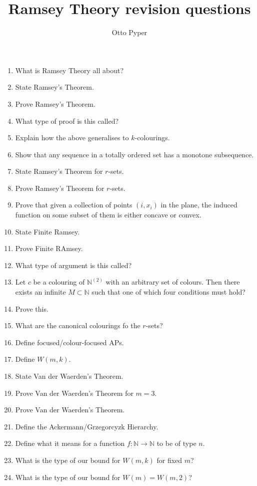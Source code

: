\documentclass[10pt]{article}
\title{Ramsey Theory revision questions}
\author{Otto Pyper}
\date{}
\newcommand{\bb}[1]{\mathbb{#1}}
\newcommand{\N}{\bb{N}}
\newcommand{\ra}{\to}
\begin{document}
\maketitle

\begin{enumerate}
    \item What is Ramsey Theory all about?
    \item State Ramsey's Theorem.
    \item Prove Ramsey's Theorem.
    \item What type of proof is this called?
    \item Explain how the above generalises to $k$-colourings.
    \item Show that any sequence in a totally ordered set has a monotone subsequence.
    \item State Ramsey's Theorem for $r$-sets.
    \item Prove Ramsey's Theorem for $r$-sets.
    \item Prove that given a collection of points $(i,x_i)$ in the plane, the induced function on some subset of them is either concave or convex.
    \item State Finite Ramsey.
    \item Prove Finite RAmsey.
    \item What type of argument is this called?
    \item Let $c$ be a colouring of $\N^{(2)}$ with an arbitrary set of colours. Then there exists an infinite $M\subset \N$ such that one of which four conditions must hold?
    \item Prove this.
    \item What are the canonical colourings fo the $r$-sets?
    \item Define focused/colour-focused APs.
    \item Define $W(m,k)$.
    \item State Van der Waerden's Theorem.
    \item Prove Van der Waerden's Theorem for $m = 3$.
    \item Prove Van der Waerden's Theorem.
    \item Define the Ackermann/Grzegorcyzk Hierarchy.
    \item Define what it means for a function $f : \N \ra \N$ to be of type $n$.
    \item What is the type of our bound for $W(m,k)$ for fixed $m$?
    \item What is the type of our bound for $W(m) = W(m,2)$?

\end{enumerate}
\end{document}
